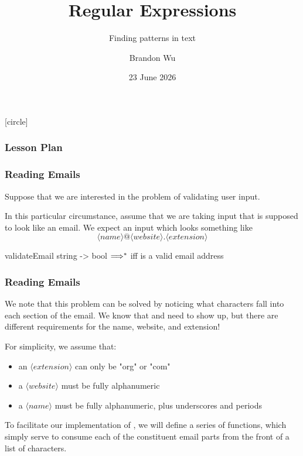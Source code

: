 \documentclass[aspectratio=169]{beamer}
\title{Regular Expressions} %
\subtitle{Finding patterns in text} %
\date{23 June 2026} %
\author{Brandon Wu} %
\newif\ifcolorlambda
\begin{document}
\ifweb
    \renewcommand{\pause}{}
\fi

[circle]

{
\begin{frame}[plain]
    \colorlambdatrue
    \titlepage
\end{frame}
}


\begin{frame}[fragile]
  \frametitle{Lesson Plan}

  \tableofcontents
\end{frame}


\begin{frame}[fragile]
  \frametitle{Reading Emails}

  Suppose that we are interested in the problem of validating user input.

  \pause
  \vspace{\fill}

  In this particular circumstance, assume that we are taking input that is
  supposed to look like an email. We expect an input which looks something like
  $$\langle name \rangle\textsf{@}\langle website\rangle\textsf{.}\langle extension \rangle$$

  \pause
  \vspace{\fill}

  \spec
    {validateEmail}
    {string -> bool}
    {}
    { $\Longrightarrow^*$  iff  is a valid
    email address}
\end{frame}

\begin{frame}[fragile]
  \frametitle{Reading Emails}

  \rprs

  We note that this problem can be solved by noticing what characters fall into
  each section of the email. We know that  and  need to show
  up, but there are different requirements for the name, website, and extension!

  \pause
  \vspace{\fill}

  For simplicity, we assume that:
  \pause
  \begin{itemize}
    \item an $\langle extension\rangle$ can only be "org" or "com" \pause
    \item a $\langle website\rangle$ must be fully alphanumeric \pause
    \item a $\langle name\rangle$ must be fully alphanumeric, plus underscores and periods
  \end{itemize}

  \pause
  \vspace{\fill}

  To facilitate our implementation of , we will define a series
  of  functions, which simply serve to consume each of the constituent
  email parts from the front of a list of characters.
\end{frame}
\end{document}
